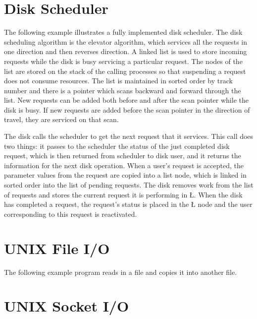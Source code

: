 \documentclass[openright,twoside]{report}
\begin{document}


\section{Disk Scheduler}
\label{s:DiskScheduler}

The following example illustrates a fully implemented disk scheduler.
The disk scheduling algorithm is the elevator algorithm, which services all the requests in one direction and then reverses direction.
A linked list is used to store incoming requests while the disk is busy servicing a particular request.
The nodes of the list are stored on the stack of the calling processes so that suspending a request does not consume resources.
The list is maintained in sorted order by track number and there is a pointer which scans backward and forward through the list.
New requests can be added both before and after the scan pointer while the disk is busy.
If new requests are added before the scan pointer in the direction of travel, they are serviced on that scan.

The disk calls the scheduler to get the next request that it services.
This call does two things: it passes to the scheduler the status of the just completed disk request, which is then returned from scheduler to disk user, and it returns the information for the next disk operation.
When a user's request is accepted, the parameter values from the request are copied into a list node, which is linked in sorted order into the list of pending requests.
The disk removes work from the list of requests and stores the current request it is performing in \LGinlinetrue\LGbegin\lgrinde\L{}\endlgrinde\LGend{}.
When the disk has completed a request, the request's status is placed in the \LGinlinetrue\LGbegin\lgrinde\L{}\endlgrinde\LGend{} node and the user corresponding to this request is reactivated.



\section{UNIX File I/O}
\label{s:UNIXFileIO}

The following example program reads in a file and copies it into another file.



\section{UNIX Socket I/O}
\label{s:UNIXSocketIO}
\end{document}
